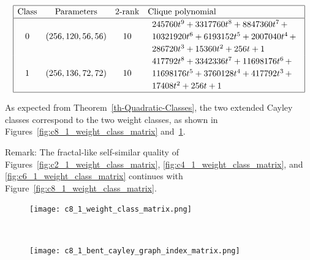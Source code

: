 \documentclass[12pt,a4paper]{article}
\begin{document}
\begin{table}[!bhpt] %
%
\small{}
\begin{align*}
\def\arraystretch{1.2}
\begin{array}{|cccl|}
\hline
\text{Class} &
\text{Parameters} &
\text{2-rank} &
\text{Clique polynomial}
\\
\hline
0 &
(256, 120, 56, 56) &
10 &
\begin{array}{l}
245760t^{9} + 3317760t^{8} + 8847360t^{7}
\,+
\\
 10321920t^{6} + 6193152t^{5} + 2007040t^{4}
\,+
\\
 286720t^{3} + 15360t^{2} + 256t + 1
\end{array}
\\
1 &
(256, 136, 72, 72) &
10 &
\begin{array}{l}
417792t^{8} + 3342336t^{7} + 11698176t^{6}
\,+
\\
 11698176t^{5} + 3760128t^{4} + 417792t^{3}
\,+
\\
 17408t^{2} + 256t + 1
\end{array}
\\
\hline
\end{array}
\end{align*}
%
\caption{$[f_{8,1}]$ extended Cayley classes.}
\label{tab-c8_1_EC_classes}
\end{table}

As expected from Theorem~\ref{th-Quadratic-Classes},
the two extended Cayley classes correspond to the two weight classes,
as shown in Figures~\ref{fig:c8_1_weight_class_matrix} and~\ref{fig:c8_1_bent_cayley_graph_index_matrix}.

Remark: The fractal-like self-similar quality of Figures~\ref{fig:c2_1_weight_class_matrix}, \ref{fig:c4_1_weight_class_matrix},
and \ref{fig:c6_1_weight_class_matrix} continues with Figure~\ref{fig:c8_1_weight_class_matrix}.

\begin{figure}[!bhpt] %
\centering
\begin{minipage}{.48\textwidth}
  \centering
  \texttt{[image: c8\_1\_weight\_class\_matrix.png]}
  \label{fig:c8_1_weight_class_matrix}
\end{minipage}%
~~~~
\begin{minipage}{.48\textwidth}
  \centering
  \texttt{[image: c8\_1\_bent\_cayley\_graph\_index\_matrix.png]}
  \label{fig:c8_1_bent_cayley_graph_index_matrix}
\end{minipage}
\end{figure}
\end{document}
